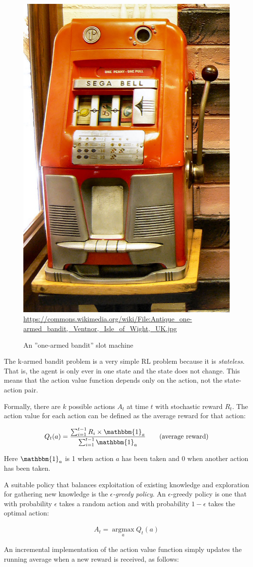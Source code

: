 \begin{figure}
\centering
\includegraphics[width=.25\textwidth]{one-armed_bandit.jpg}\\
\tiny \url{https://commons.wikimedia.org/wiki/File:Antique_one-armed_bandit,_Ventnor,_Isle_of_Wight,_UK.jpg}
\caption{An ''one-armed bandit'' slot machine}
\label{fig:bandit}
\end{figure}

The k-armed bandit problem is a very simple RL problem because it is \emph{stateless}. That is, the agent is only ever in one state and the state does not change. This means that the action value function depends only on the action, not the state-action pair.

Formally, there are $k$ possible actions $A_t$ at time $t$ with stochastic reward $R_t$. The action value for each action can be defined as the average reward for that action:

\begin{align*}
   Q_t(a) = \frac{\sum_{i=1}^{t-1} R_i \times \mathbbm{1}_a}{\sum_{i=1}^{t-1} \mathbbm{1}_a} \qquad \text{(average reward)}
\end{align*}

Here $\mathbbm{1}_a$ is 1 when action $a$ has been taken and 0 when another action has been taken. 

A suitable policy that balances exploitation of existing knowledge and exploration for gathering new knowledge is the \emph{$\epsilon$-greedy policy}. An $\epsilon$-greedy policy is one that with probability $\epsilon$ takes a random action and with probability $1-\epsilon$ takes the optimal action:

\begin{align*}
A_t = \operatorname*{arg max}_a Q_t(a)
\end{align*}

An incremental implementation of the action value function simply updates the running average when a new reward is received, as follows:

